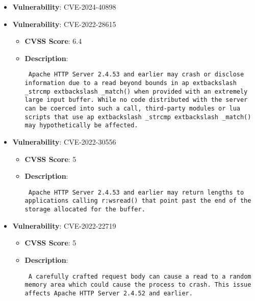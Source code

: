 \documentclass{article}
\begin{document}
\begin{itemize}
        \item \textbf{Vulnerability}: CVE-2024-40898
    
        \item \textbf{Vulnerability}: CVE-2022-28615
        \begin{itemize}
            \item \textbf{CVSS Score}:  6.4 
            \item \textbf{Description}: \parbox{\linewidth}{\texttt{ Apache HTTP Server 2.4.53 and earlier may crash or disclose information due to a read beyond bounds in ap	extbackslash _strcmp	extbackslash _match() when provided with an extremely large input buffer. While no code distributed with the server can be coerced into such a call, third-party modules or lua scripts that use ap	extbackslash _strcmp	extbackslash _match() may hypothetically be affected. }}
        \end{itemize}
    
        \item \textbf{Vulnerability}: CVE-2022-30556
        \begin{itemize}
            \item \textbf{CVSS Score}:  5 
            \item \textbf{Description}: \parbox{\linewidth}{\texttt{ Apache HTTP Server 2.4.53 and earlier may return lengths to applications calling r:wsread() that point past the end of the storage allocated for the buffer. }}
        \end{itemize}
    
        \item \textbf{Vulnerability}: CVE-2022-22719
        \begin{itemize}
            \item \textbf{CVSS Score}:  5 
            \item \textbf{Description}: \parbox{\linewidth}{\texttt{ A carefully crafted request body can cause a read to a random memory area which could cause the process to crash. This issue affects Apache HTTP Server 2.4.52 and earlier. }}
        \end{itemize}
    
\end{itemize}
\end{document}
